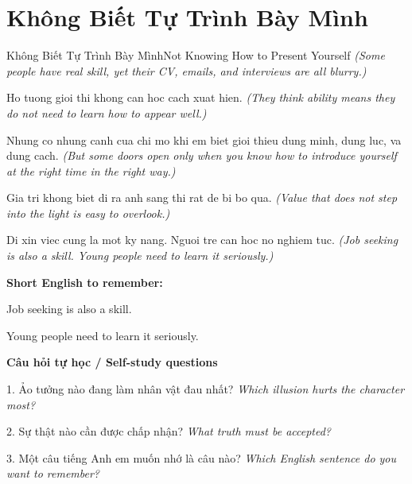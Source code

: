 \section{Không Biết Tự Trình Bày Mình}
\begin{truyen}{Không Biết Tự Trình Bày Mình}{Not Knowing How to Present Yourself}
\textit{(Some people have real skill, yet their CV, emails, and interviews are all blurry.)}

Ho tuong gioi thi khong can hoc cach xuat hien.
\textit{(They think ability means they do not need to learn how to appear well.)}

Nhung co nhung canh cua chi mo khi em biet gioi thieu dung minh, dung luc, va dung cach.
\textit{(But some doors open only when you know how to introduce yourself at the right time in the right way.)}

Gia tri khong biet di ra anh sang thi rat de bi bo qua.
\textit{(Value that does not step into the light is easy to overlook.)}

\end{truyen}

\begin{baihoc}
Di xin viec cung la mot ky nang. Nguoi tre can hoc no nghiem tuc.
\textit{(Job seeking is also a skill. Young people need to learn it seriously.)}
\end{baihoc}

\begin{ghinhoanh}
\textbf{Short English to remember:}

Job seeking is also a skill.

Young people need to learn it seriously.

\end{ghinhoanh}

\begin{tuhocnhanh}
\textbf{Câu hỏi tự học / Self-study questions}

1. Ảo tưởng nào đang làm nhân vật đau nhất? \textit{Which illusion hurts the character most?}

2. Sự thật nào cần được chấp nhận? \textit{What truth must be accepted?}

3. Một câu tiếng Anh em muốn nhớ là câu nào? \textit{Which English sentence do you want to remember?}
\end{tuhocnhanh}
\ngancach

